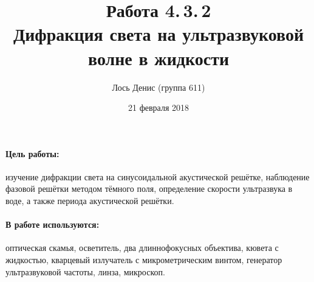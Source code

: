 \documentclass[12pt]{article}
\title{{\bf Работа 4.\,3.\,2 \\ Дифракция света на ультразвуковой волне в жидкости}}
\author{Лось Денис (группа 611)}
\date{21 февраля 2018}
\begin{document}
\maketitle

\paragraph{Цель работы: } изучение дифракции света на синусоидальной акустической решётке, наблюдение фазовой решётки методом тёмного поля, определение скорости ультразвука в воде, а также периода акустической решётки.

\paragraph{В работе используются: } оптическая скамья, осветитель, два длиннофокусных объектива, кювета с жидкостью, кварцевый излучатель с микрометрическим винтом, генератор ультразвуковой частоты, линза, микроскоп.
\end{document}
